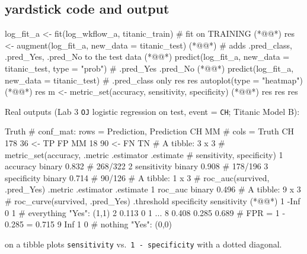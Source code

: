 \subsection{yardstick code and output}
\begin{rcode}
log_fit_a <- fit(log_wkflow_a, titanic_train)      # fit on TRAINING (*@@*)
res <- augment(log_fit_a, new_data = titanic_test)  (*@@*)
# adds .pred_class, .pred_Yes, .pred_No to the test data (*@@*)
predict(log_fit_a, new_data = titanic_test, type = "prob") # .pred_Yes .pred_No (*@@*)
predict(log_fit_a, new_data = titanic_test)        # .pred_class only
res %
res %
  autoplot(type = "heatmap") (*@@*)
res %
m <- metric_set(accuracy, sensitivity, specificity) (*@@*)
res %
res %
res %
\end{rcode}
Real outputs (Lab 3 \texttt{OJ} logistic regression on test, event = \texttt{CH}; Titanic Model B):
\begin{routput}
          Truth                            # conf_mat: rows = Prediction,
Prediction  CH  MM                         #           cols = Truth
        CH 178  36      <- TP  FP
        MM  18  90      <- FN  TN
# A tibble: 3 x 3                          # metric_set(accuracy,
  .metric     .estimator .estimate         #   sensitivity, specificity)
1 accuracy    binary         0.832         # 268/322
2 sensitivity binary         0.908         # 178/196
3 specificity binary         0.714         # 90/126
# A tibble: 1 x 3                          # roc_auc(survived, .pred_Yes)
  .metric .estimator .estimate
1 roc_auc binary         0.496
# A tibble: 9 x 3                          # roc_curve(survived, .pred_Yes)
  .threshold specificity sensitivity       (*@@*)
1   -Inf          0            1           # everything "Yes": (1,1)
2      0.113      0            1
...
8      0.408      0.285        0.689       # FPR = 1 - 0.285 = 0.715
9    Inf          1            0           # nothing "Yes": (0,0)
\end{routput}
 on a  tibble plots \texttt{sensitivity} vs.\ \texttt{1 - specificity} with a dotted diagonal.

